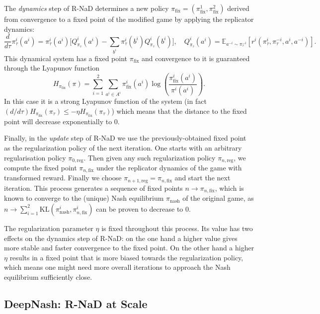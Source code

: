 The \textit{dynamics} step of R-NaD determines a new policy $\pi_{\textrm{fix}} = (\pi^1_{\textrm{fix}}, \pi^2_{\textrm{fix}})$ derived from convergence to a fixed point of the modified game by applying the replicator dynamics:
$$\frac{d}{d\tau}\pi^i_\tau(a^i) = \pi^i_\tau(a^i)\Big[Q^i_{\pi_\tau}(a^i)-\sum_{b^i}\pi^i_\tau(b^i)Q^i_{\pi_\tau}(b^i)\Big],\quad Q^i_{\pi_\tau}(a^i) = \mathbb{E}_{a^{-i}\sim \pi^{-i}_\tau}\!\left[r^i(\pi^i_\tau, \pi^{-i}_\tau,a^i, a^{-i})\right].$$
This dynamical system has a fixed point $\pi_{\textrm{fix}}$ and convergence to it is guaranteed through the Lyapunov function
$$H_{\pi_{\textrm{fix}}}(\pi) = \sum_{i=1}^{2} \sum_{a^i \in A^i} \pi^i_{\textrm{fix}}(a^i)\log\!\left(\frac{\pi^i_{\textrm{fix}}(a^i)}{\pi^i(a^i)}\right).$$
In this case it is a strong Lyapunov function of the system (in fact $(d/d\tau)H_{\pi_{\textrm{fix}}}(\pi_\tau)\leq -\eta H_{\pi_{\textrm{fix}}}(\pi_\tau)$) which means that the distance to the fixed point will decrease exponentially to $0$.

Finally, in the \textit{update} step of R-NaD we use the previously-obtained fixed point as the regularization policy of the next iteration. One starts with an arbitrary regularisation policy $\pi_{0,\textrm{reg}}$. Then given any such regularization policy $\pi_{n,\textrm{reg}}$, we compute the fixed point $\pi_{n,\textrm{fix}}$ under the replicator dynamics of the game with transformed reward. Finally we choose $\pi_{n+1,\textrm{reg}} = \pi_{n,\textrm{fix}}$ and start the next iteration. This process generates a sequence of fixed points $n \rightarrow \pi_{n,\textrm{fix}}$, which is known to converge to the (unique) Nash equilibrium $\pi_{\textrm{nash}}$ of the original game, as $n \rightarrow \sum_{i=1}^2 \textrm{KL}(\pi^i_{\textrm{nash}},\pi^i_{n,\textrm{fix}})$ can be proven to decrease to $0$.

The regularization parameter $\eta$ is fixed throughout this process. Its value has two effects on the dynamics step of R-NaD: on the one hand a higher value gives more stable and faster convergence to the fixed point. On the other hand a higher $\eta$ results in a fixed point that is more biased towards the regularization policy, which means one might need more overall iterations to approach the Nash equilibrium sufficiently close.

\subsection{DeepNash: R-NaD at Scale}

